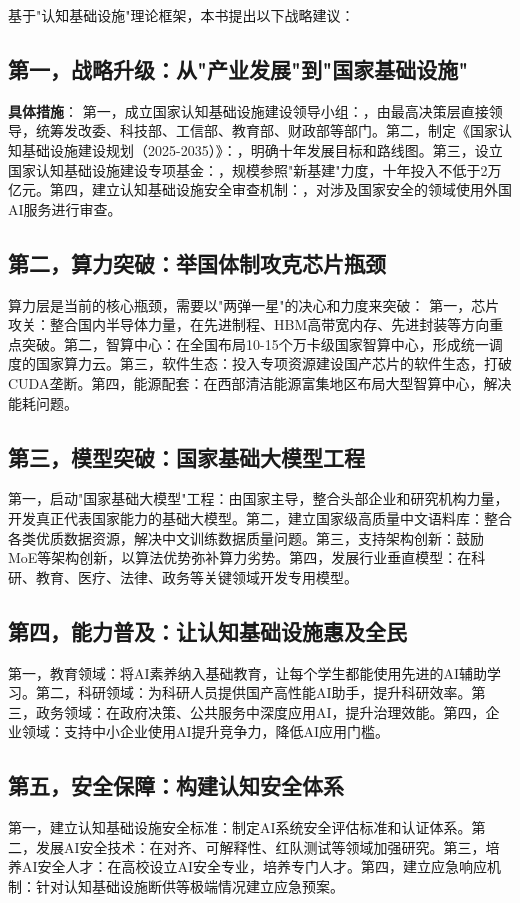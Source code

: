 基于"认知基础设施"理论框架，本书提出以下战略建议：

\subsection{第一，战略升级：从"产业发展"到"国家基础设施"}

\textbf{具体措施}：
第一，成立国家认知基础设施建设领导小组：，由最高决策层直接领导，统筹发改委、科技部、工信部、教育部、财政部等部门。第二，制定《国家认知基础设施建设规划（2025-2035）》：，明确十年发展目标和路线图。第三，设立国家认知基础设施建设专项基金：，规模参照"新基建"力度，十年投入不低于2万亿元。第四，建立认知基础设施安全审查机制：，对涉及国家安全的领域使用外国AI服务进行审查。

\subsection{第二，算力突破：举国体制攻克芯片瓶颈}

算力层是当前的核心瓶颈，需要以"两弹一星"的决心和力度来突破：
第一，芯片攻关：整合国内半导体力量，在先进制程、HBM高带宽内存、先进封装等方向重点突破。第二，智算中心：在全国布局10-15个万卡级国家智算中心，形成统一调度的国家算力云。第三，软件生态：投入专项资源建设国产芯片的软件生态，打破CUDA垄断。第四，能源配套：在西部清洁能源富集地区布局大型智算中心，解决能耗问题。

\subsection{第三，模型突破：国家基础大模型工程}
第一，启动"国家基础大模型"工程：由国家主导，整合头部企业和研究机构力量，开发真正代表国家能力的基础大模型。第二，建立国家级高质量中文语料库：整合各类优质数据资源，解决中文训练数据质量问题。第三，支持架构创新：鼓励MoE等架构创新，以算法优势弥补算力劣势。第四，发展行业垂直模型：在科研、教育、医疗、法律、政务等关键领域开发专用模型。

\subsection{第四，能力普及：让认知基础设施惠及全民}
第一，教育领域：将AI素养纳入基础教育，让每个学生都能使用先进的AI辅助学习。第二，科研领域：为科研人员提供国产高性能AI助手，提升科研效率。第三，政务领域：在政府决策、公共服务中深度应用AI，提升治理效能。第四，企业领域：支持中小企业使用AI提升竞争力，降低AI应用门槛。

\subsection{第五，安全保障：构建认知安全体系}
第一，建立认知基础设施安全标准：制定AI系统安全评估标准和认证体系。第二，发展AI安全技术：在对齐、可解释性、红队测试等领域加强研究。第三，培养AI安全人才：在高校设立AI安全专业，培养专门人才。第四，建立应急响应机制：针对认知基础设施断供等极端情况建立应急预案。

